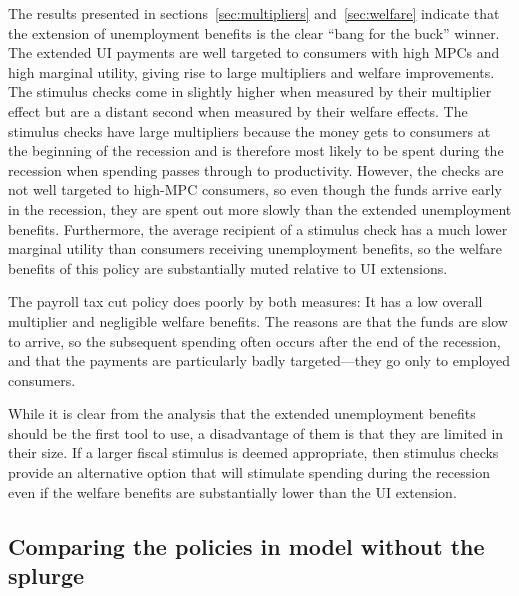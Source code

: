 \documentclass[\econtexRoot/HAFiscal]{subfiles}
\begin{document}
The results presented in sections~\ref{sec:multipliers} and~\ref{sec:welfare} indicate that the extension of unemployment benefits is the clear ``bang for the buck'' winner. The extended UI payments are well targeted to consumers with high MPCs and high marginal utility, giving rise to large multipliers and welfare improvements. The stimulus checks come in slightly higher when measured by their multiplier effect but are a distant second when measured by their welfare effects. The stimulus checks have large multipliers because the money gets to consumers at the beginning of the recession and is therefore most likely to be spent during the recession when spending passes through to productivity.  However, the checks are not well targeted to high-MPC consumers, so even though the funds arrive early in the recession, they are spent out more slowly than the extended unemployment benefits. Furthermore, the average recipient of a stimulus check has a much lower marginal utility than consumers receiving unemployment benefits, so the welfare benefits of this policy are substantially muted relative to UI extensions.

The payroll tax cut policy does poorly by both measures: It has a low overall multiplier and negligible welfare benefits. The reasons are that the funds are slow to arrive, so the subsequent spending often occurs after the end of the recession, and that the payments are particularly badly targeted---they go only to employed consumers.

While it is clear from the analysis that the extended unemployment benefits should be the first tool to use, a disadvantage of them is that they are limited in their size. If a larger fiscal stimulus is deemed appropriate, then stimulus checks provide an alternative option that will stimulate spending during the recession even if the welfare benefits are substantially lower than the UI extension.


\FloatBarrier
\hypertarget{comparing-the-policies-splurge}{}\par\subsection{Comparing the policies in model without the splurge} 
\end{document}

